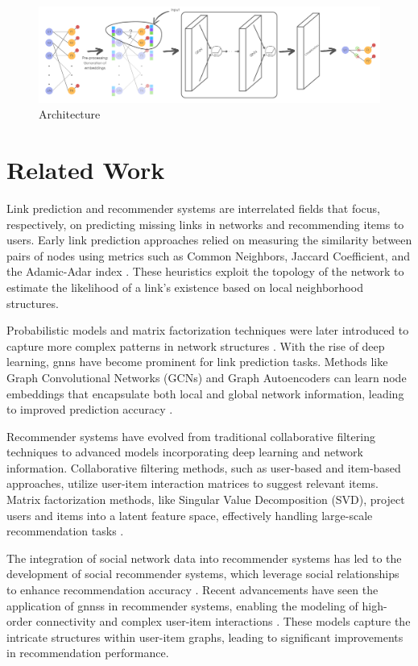 \documentclass[11pt]{article}
\begin{document}
\begin{figure}[b]
  \centering
  \includegraphics[width=1\linewidth]{figures/architecture.pdf}

  \caption{
    Architecture
  }
  \label{fig:architecture}
\end{figure}

\section{Related Work}\label{sec:related-work}

Link prediction and recommender systems are interrelated fields that focus, respectively, on predicting missing links in networks 
and recommending items to users. Early link prediction approaches relied on measuring the similarity 
between pairs of nodes using metrics such as Common Neighbors, Jaccard Coefficient, and the Adamic-Adar index 
\cite{liben2003link}. These heuristics exploit the topology of the network to estimate the likelihood 
of a link's existence based on local neighborhood structures.

Probabilistic models and matrix factorization techniques were later introduced to capture more complex 
patterns in network structures \cite{koren2009matrix}. With the rise of deep learning, \acp{gnn} have become 
prominent for link prediction tasks. Methods like Graph Convolutional Networks (GCNs) and 
Graph Autoencoders can learn node embeddings that encapsulate both local and global network information, 
leading to improved prediction accuracy \cite{kipf2016semi}.

Recommender systems have evolved from traditional collaborative filtering techniques to advanced models 
incorporating deep learning and network information. Collaborative filtering methods, such as user-based 
and item-based approaches, utilize user-item interaction matrices to suggest relevant items. 
Matrix factorization methods, like Singular Value Decomposition (SVD), project users and items into a latent 
feature space, effectively handling large-scale recommendation tasks \cite{sarwar2001item}.

The integration of social network data into recommender systems has led to the development of social recommender 
systems, which leverage social relationships to enhance recommendation accuracy \cite{jamali2010matrix}. 
Recent advancements have seen the application of \acp{gnn}s in recommender systems, enabling the modeling of high-order 
connectivity and complex user-item interactions \cite{wang2019neural}. These models capture the intricate structures 
within user-item graphs, leading to significant improvements in recommendation performance.
\end{document}
